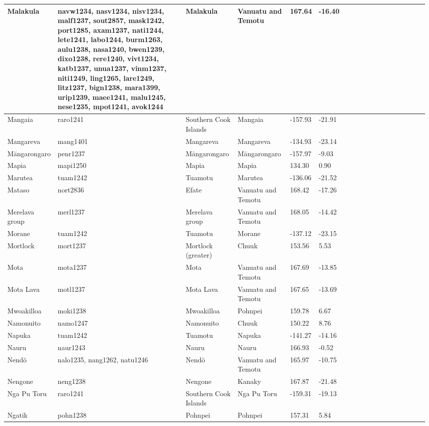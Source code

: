 \documentclass[a4paper,10pt]{article} %
\begin{document}
\begin{landscape}
\begin{longtable}{| p{2.5cm} |  p{7cm} | p{2.5cm}  | p{2.5cm}  | p{2.5cm}  | p{2.5cm}  | p{2.5cm}  | p{2cm}  | p{1cm} | p{1cm}  | p{1cm} | p{1cm}  | p{1.5cm}  | p{1cm} | p{1cm}  | p{1cm}  |p{1cm}  | p{1cm}    |}
 Malakula & navw1234, nasv1234, nisv1234, malf1237, sout2857, mask1242, port1285, axam1237, nati1244, lete1241, labo1244, burm1263, aulu1238, nasa1240, bwen1239, dixo1238, rere1240, vivt1234, katb1237, unua1237, vinm1237, niti1249, ling1265, lare1249, litz1237, bign1238, mara1399, urip1239, maee1241, malu1245, nese1235, mpot1241, avok1244 & Malakula & Vanuatu and Temotu & 167.64 & -16.40 \\ \hline
 Mangaia & raro1241 & Southern Cook Islands & Mangaia & -157.93 & -21.91 \\ \hline
 Mangareva & mang1401 & Mangareva & Mangareva & -134.93 & -23.14 \\ \hline
 M\={a}ngarongaro & penr1237 & M\={a}ngarongaro & M\={a}ngarongaro & -157.97 & -9.03 \\ \hline
 Mapia & mapi1250 & Mapia & Mapia & 134.30 & 0.90 \\ \hline
 Marutea & tuam1242 & Tuamotu & Marutea & -136.06 & -21.52 \\ \hline
 Mataso & nort2836 & Efate & Vanuatu and Temotu & 168.42 & -17.26 \\ \hline
 Merelava group & merl1237 & Merelava group & Vanuatu and Temotu & 168.05 & -14.42 \\ \hline
 Morane & tuam1242 & Tuamotu & Morane & -137.12 & -23.15 \\ \hline
 Mortlock & mort1237 & Mortlock (greater) & Chuuk & 153.56 & 5.53 \\ \hline
 Mota & mota1237 & Mota & Vanuatu and Temotu & 167.69 & -13.85 \\ \hline
 Mota Lava & motl1237 & Mota Lava & Vanuatu and Temotu & 167.65 & -13.69 \\ \hline
 Mwoakilloa & moki1238 & Mwoakilloa & Pohnpei & 159.78 & 6.67 \\ \hline
 Namonuito & namo1247 & Namonuito & Chuuk & 150.22 & 8.76 \\ \hline
 Napuka & tuam1242 & Tuamotu & Napuka & -141.27 & -14.16 \\ \hline
 Nauru & naur1243 & Nauru & Nauru & 166.93 & -0.52 \\ \hline
 Nendö & nalo1235, nang1262, natu1246 & Nendö & Vanuatu and Temotu & 165.97 & -10.75 \\ \hline
 Nengone & neng1238 & Nengone & Kanaky & 167.87 & -21.48 \\ \hline
 Nga Pu Toru & raro1241 & Southern Cook Islands & Nga Pu Toru & -159.31 & -19.13 \\ \hline
 Ngatik & pohn1238 & Pohnpei & Pohnpei & 157.31 & 5.84 \\ \hline

\end{longtable}
\end{landscape}
\end{document}
